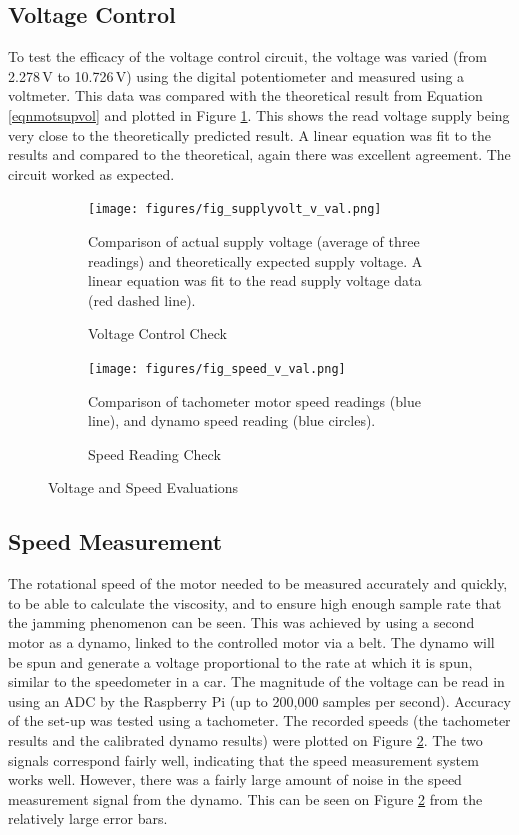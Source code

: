 \documentclass[twoside,a4]{report}
\begin{document}
	\subsection*{Voltage Control}
	To test the efficacy of the voltage control circuit, the voltage was varied (from 2.278\,V to 10.726\,V) using the digital potentiometer and measured using a voltmeter. This data was compared with the theoretical result from Equation \ref{eqnmotsupvol} and plotted in Figure \ref{figvoltvval}. This shows the read voltage supply being very close to the theoretically predicted result. A linear equation was fit to the results and compared to the theoretical, again there was excellent agreement. The circuit worked as expected.
	\begin{figure}[!htb]
		\centering
		\begin{subfigure}[t]{0.45\textwidth}
			\centering
			\texttt{[image: figures/fig\_supplyvolt\_v\_val.png]}
			\caption{Voltage Control Check}
			\label{figvoltvval}
			\footnotesize
			Comparison of actual supply voltage (average of three readings) and theoretically expected supply voltage. A linear equation was fit to the read supply voltage data (red dashed line).
		\end{subfigure}
		\begin{subfigure}[t]{0.45\textwidth}
			\centering
			\texttt{[image: figures/fig\_speed\_v\_val.png]}
			\caption{Speed Reading Check}
			\label{figdynocheck}
			\footnotesize
			Comparison of tachometer motor speed readings (blue line), and dynamo speed reading (blue circles).
		\end{subfigure}
		\label{figspeecal}
		\caption{Voltage and Speed Evaluations}
	\end{figure}
	
	\subsection*{Speed Measurement} %
	The rotational speed of the motor needed to be measured accurately and quickly, to be able to calculate the viscosity, and to ensure high enough sample rate that the jamming phenomenon can be seen. This was achieved by using a second motor as a dynamo, linked to the controlled motor via a belt. The dynamo will be spun and generate a voltage proportional to the rate at which it is spun, similar to the speedometer in a car. The magnitude of the voltage can be read in using an ADC by the Raspberry Pi (up to 200,000 samples per second). Accuracy of the set-up was tested using a tachometer. The recorded speeds (the tachometer results and the calibrated dynamo results) were plotted on Figure \ref{figdynocheck}. The two signals correspond fairly well, indicating that the speed measurement system works well. However, there was a fairly large amount of noise in the speed measurement signal from the dynamo. This can be seen on Figure \ref{figdynocheck} from the relatively large error bars. 
	
\end{document}
